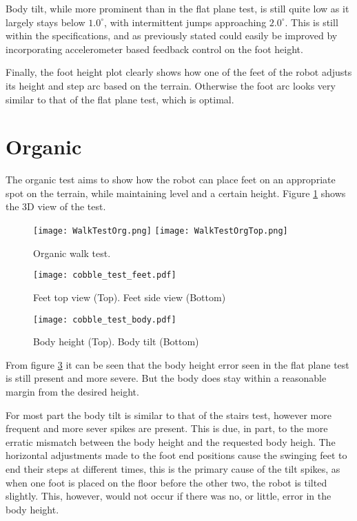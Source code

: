     Body tilt, while more prominent than in the flat plane test, is still quite low as it largely stays below \(1.0^\circ\), with intermittent jumps approaching \(2.0^\circ\).
    This is still within the specifications, and as previously stated could easily be improved by incorporating accelerometer based feedback control on the foot height.

    \noindent
    Finally, the foot height plot clearly shows how one of the feet of the robot adjusts its height and step arc based on the terrain. Otherwise the foot arc looks very similar to that of the
    flat plane test, which is optimal.
    
    \newpage
    \section{Organic}
    The organic test aims to show how the robot can place feet on an appropriate spot on the terrain, while maintaining level and a certain height. Figure \ref{fig:org_test} shows the
    3D view of the test.
    \begin{figure}[h]
        \centering
        \texttt{[image: WalkTestOrg.png]}
        \texttt{[image: WalkTestOrgTop.png]}
        \caption{Organic walk test.}
        \label{fig:org_test}
    \end{figure}
    \begin{figure}[h]
        \centering
        \texttt{[image: cobble\_test\_feet.pdf]}
        \caption{Feet top view (Top). Feet side view (Bottom)}
        \label{fig:org_test_data}
    \end{figure}
    \begin{figure}[h]
        \centering
        \texttt{[image: cobble\_test\_body.pdf]}
        \caption{Body height (Top). Body tilt (Bottom)}
        \label{fig:org_test_data}
    \end{figure}

    \noindent
    From figure \ref{fig:org_test_data} it can be seen that the body height error seen in the flat plane test
    is still present and more severe. But the body does stay within a reasonable margin from the desired height.

    For most part the body tilt is similar to that of the stairs test, however more frequent and more sever spikes are present.
    This is due, in part, to the more erratic mismatch between the body height and the requested body heigh. The horizontal adjustments made to 
    the foot end positions cause the swinging feet to end their steps at different times, this is the primary cause of the tilt spikes, as when one
    foot is placed on the floor before the other two, the robot is tilted slightly. This, however, would not occur if there was no, or little, 
    error in the body height.


